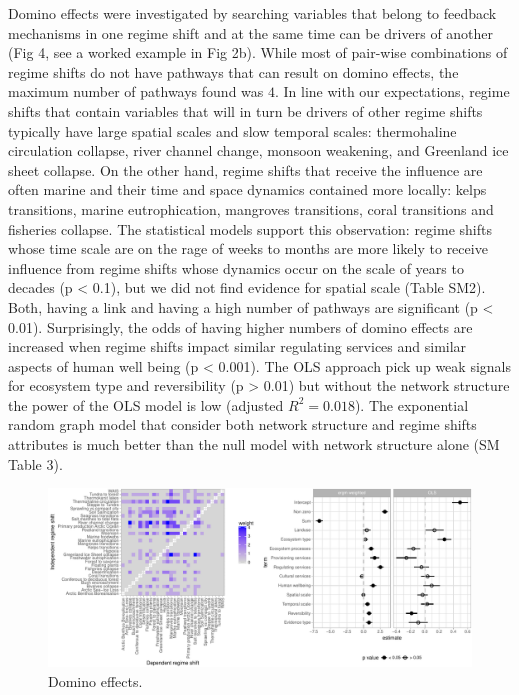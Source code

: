 \documentclass[9pt,]{article}
\begin{document}
Domino effects were investigated by searching variables that belong to
feedback mechanisms in one regime shift and at the same time can be
drivers of another (Fig 4, see a worked example in Fig 2b). While most
of pair-wise combinations of regime shifts do not have pathways that can
result on domino effects, the maximum number of pathways found was
\(4\). In line with our expectations, regime shifts that contain
variables that will in turn be drivers of other regime shifts typically
have large spatial scales and slow temporal scales: thermohaline
circulation collapse, river channel change, monsoon weakening, and
Greenland ice sheet collapse. On the other hand, regime shifts that
receive the influence are often marine and their time and space dynamics
contained more locally: kelps transitions, marine eutrophication,
mangroves transitions, coral transitions and fisheries collapse. The
statistical models support this observation: regime shifts whose time
scale are on the rage of weeks to months are more likely to receive
influence from regime shifts whose dynamics occur on the scale of years
to decades (p \textless{} 0.1), but we did not find evidence for spatial
scale (Table SM2). Both, having a link and having a high number of
pathways are significant (p \textless{} 0.01). Surprisingly, the odds of
having higher numbers of domino effects are increased when regime shifts
impact similar regulating services and similar aspects of human well
being (p \textless{} 0.001). The OLS approach pick up weak signals for
ecosystem type and reversibility (p \textgreater{} 0.01) but without the
network structure the power of the OLS model is low (adjusted
\(R^2= 0.018\)). The exponential random graph model that consider both
network structure and regime shifts attributes is much better than the
null model with network structure alone (SM Table 3).

\begin{figure}

{\centering \includegraphics{170417_draft_files/figure-latex/Fig4-1} 

}

\caption{Domino effects.}\label{fig:Fig4}
\end{figure}
\end{document}
